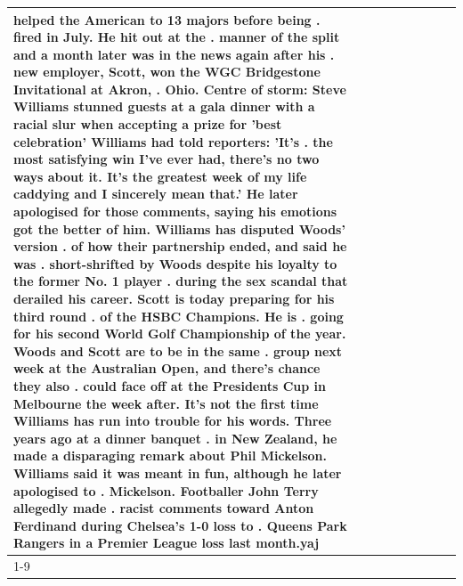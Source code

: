 \begin{table}[H]
\begin{tabular}{lllrlllll}
helped the American to 13 majors before being . fired in July. He hit out at the . manner of the split and a month later was in the news again after his . new employer, Scott, won the WGC Bridgestone Invitational at Akron, . Ohio. Centre of storm: Steve Williams stunned guests at a gala dinner with a racial slur when accepting a prize for 'best celebration' Williams had told reporters: 'It's . the most satisfying win I've ever had, there's no two ways about it. It's the greatest week of my life caddying and I sincerely mean that.' He later apologised for those comments, saying his emotions got the better of him. Williams has disputed Woods' version . of how their partnership ended, and said he was . short-shrifted by Woods despite his loyalty to the former No. 1 player . during the sex scandal that derailed his career. Scott is today preparing for his third round . of the HSBC Champions. He is . going for his second World Golf Championship of the year. Woods and Scott are to be in the same . group next week at the Australian Open, and there's chance they also . could face off at the Presidents Cup in Melbourne the week after. It's not the first time Williams has run into trouble for his words. Three years ago at a dinner banquet . in New Zealand, he made a disparaging remark about Phil Mickelson. Williams said it was meant in fun, although he later apologised to . Mickelson. Footballer John Terry allegedly made . racist comments toward Anton Ferdinand during Chelsea's 1-0 loss to . Queens Park Rangers in a Premier League loss last month.yaj \\
\cline{1-9}

\end{tabular}
\end{table}
